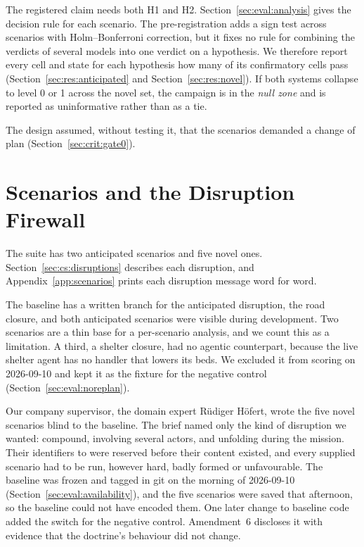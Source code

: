 The registered claim needs both H1 and H2. Section~\ref{sec:eval:analysis} gives the decision rule for each
scenario. The pre-registration adds a sign test across scenarios with
Holm--Bonferroni correction, but it fixes no rule for combining the verdicts of
several models into one verdict on a hypothesis. We therefore report every cell
and state for each hypothesis how many of its confirmatory cells pass
(Section~\ref{sec:res:anticipated} and Section~\ref{sec:res:novel}). If
both systems collapse to level 0 or 1 across the novel set, the campaign is in
the \emph{null zone} and is reported as uninformative rather than as a tie.

The design assumed, without testing it, that the scenarios demanded a change
of plan (Section~\ref{sec:crit:gate0}).

\section{Scenarios and the Disruption Firewall}
\label{sec:eval:scenarios}
\label{sec:eval:firewall}

The suite has two anticipated scenarios and five novel ones.
Section~\ref{sec:cs:disruptions} describes each disruption, and
Appendix~\ref{app:scenarios} prints each disruption message word for word.

The baseline has a written branch for the anticipated disruption, the road
closure, and both anticipated scenarios were visible during development. Two scenarios are a thin base for a
per-scenario analysis, and we count this as a limitation. A third, a shelter
closure, had no agentic counterpart, because the live shelter agent has no
handler that lowers its beds. We excluded it from scoring on 2026-09-10 and
kept it as the fixture for the negative control
(Section~\ref{sec:eval:noreplan}).

Our company supervisor, the domain expert Rüdiger Höfert,
wrote the five novel scenarios blind to the baseline. The brief named only the kind of disruption we wanted:
compound, involving several actors, and unfolding during the mission. Their
identifiers  to  were reserved before their content
existed, and every supplied scenario had to be run, however hard, badly formed
or unfavourable. The baseline was frozen and tagged in git on the morning of
2026-09-10 (Section~\ref{sec:eval:availability}), and the five scenarios were
saved that afternoon, so the baseline could not have encoded them. One later
change to baseline code added the switch for the negative control. Amendment~6 discloses it with evidence that
the doctrine's behaviour did not change.


